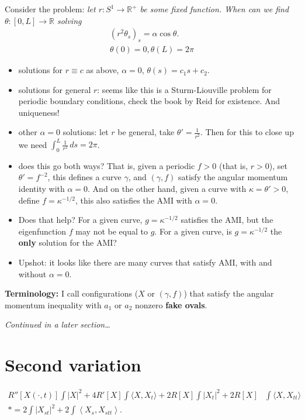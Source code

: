 \documentclass[12pt, a4paper]{amsart}
\theoremstyle{remark}
\begin{document}
Consider the problem:  \textit{let $r:S^1\rightarrow \mathbb{R}^+$ be some fixed function.   When can we find $\theta:[0,L] \rightarrow \mathbb{R}$ solving
\begin{gather*}(r^2 \theta_s )_s=\alpha\cos\theta.\\
\theta(0)=0, \theta(L)=2\pi
\end{gather*}
}
\begin{itemize}
\item solutions for  $r\equiv c$ as above, $\alpha=0$, $\theta(s)= c_1 s + c_2$.  
\item solutions for general $r$:   seems like this is a Sturm-Liouville problem for periodic boundary conditions, check the book by Reid for existence.   And uniqueness!
\item other $\alpha=0$ solutions:  let $r$ be general, take $\theta'=\frac1{r^2}$.     Then for this to close up we need $\int_0^L \frac1{r^2}\,ds=2\pi$. 
\item does this go both ways?  That is, given a periodic $f>0$ (that is, $r>0$), set $\theta'=f^{-2}$, this defines a curve $\gamma$, and $(\gamma,f)$ satisfy the angular momentum identity with $\alpha=0$.  And on the other hand, given a curve with $\kappa=\theta'>0$, define $f=\kappa^{-1/2}$, this also satisfies the AMI with $\alpha=0$.
\item Does that help?   For a given curve, $g=\kappa^{-1/2}$ satisfies the AMI, but the eigenfunction $f$ may not be equal to $g$.   For a given curve, is $g=\kappa^{-1/2}$ the \textbf{only} solution for the AMI?  
\item Upshot: it looks like there  are many curves that satisfy AMI, with and without $\alpha=0$.   
\end{itemize}



\bigskip
\textbf{Terminology:} I call configurations ($X$ or $(\gamma,f)$) that satisfy the angular momentum inequality with $a_1$ or $a_2$ nonzero \textbf{fake ovals}.
 
 
 \textit{Continued in a later section\dots}
 
   
\section*{Second variation}
\begin{align*}
R'' [X(\cdot,t)] \int |X|^2 +  4 R'[X]\int\langle X,X_t\rangle  +  2 R[X]  \int  |X_t|^2  + 2 R[X]& \int\langle X,X_{tt}\rangle
\\*=     2\int \left|  X_{st}\right|^2 +   2\int \left\langle X_s, X_{stt}\right\rangle.
\end{align*}
  
\end{document}
